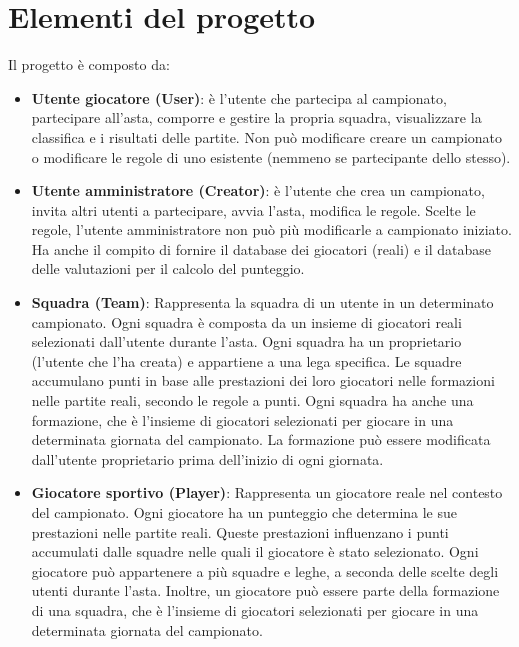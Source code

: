 \documentclass[twoside,openright,titlepage,fleqn,headinclude,12pt,a4paper,BCOR=5mm,footinclude]{scrbook}
\begin{document}
\section{Elementi del progetto}
Il progetto è composto da:
\begin{itemize}

    \item \textbf{Utente giocatore (User)}: è l'utente che partecipa al campionato, partecipare all'asta, comporre e gestire la propria squadra, 
    visualizzare la classifica e i risultati delle partite. Non può modificare creare un campionato o modificare le regole di uno esistente 
    (nemmeno se partecipante dello stesso).
    
    \item \textbf{Utente amministratore (Creator)}: è l'utente che crea un campionato, invita altri utenti a partecipare, avvia l'asta, modifica le regole. 
    Scelte le regole, l'utente amministratore non può più modificarle a campionato iniziato. Ha anche il compito di fornire il database dei giocatori 
    (reali) e il database delle valutazioni per il calcolo del punteggio.
    
    \item \textbf{Squadra (Team)}: Rappresenta la squadra di un utente in un determinato campionato. Ogni squadra è composta da un insieme di giocatori reali selezionati dall'utente durante l'asta. Ogni squadra ha un proprietario (l'utente che l'ha creata) e appartiene a una lega specifica. Le squadre accumulano punti in base alle prestazioni dei loro giocatori nelle formazioni nelle partite reali, secondo le regole a punti. Ogni squadra ha anche una formazione, che è l'insieme di giocatori selezionati per giocare in una determinata giornata del campionato. La formazione può essere modificata dall'utente proprietario prima dell'inizio di ogni giornata.
     
     \item \textbf{Giocatore sportivo (Player)}: Rappresenta un giocatore reale nel contesto del campionato. Ogni giocatore ha un punteggio che determina le sue prestazioni nelle partite reali. Queste prestazioni influenzano i punti accumulati dalle squadre nelle quali il giocatore è stato selezionato. Ogni giocatore può appartenere a più squadre e leghe, a seconda delle scelte degli utenti durante l'asta. Inoltre, un giocatore può essere parte della formazione di una squadra, che è l'insieme di giocatori selezionati per giocare in una determinata giornata del campionato.


\end{itemize}
\end{document}
